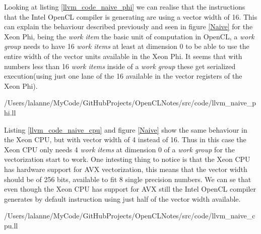 \par{Looking at listing \ref{llvm_code_naive_phi} we can realise that the 
    instructions that the Intel OpenCL compiler is generating are using a vector
    width of 16. This can explain the behaviour described previously and seen in
    figure \ref{Naive} for the Xeon Phi, being the \emph{work item} the basic 
    unit of computation in OpenCL, a \emph{work group} needs to have 16 \emph{
    work items} at least at dimension 0 to be able to use the entire width
    of the vector units available in the Xeon Phi. It seems that with numbers 
    less than 16 \emph{work items} inside of a \emph{work group} these 
    get serialized execution(using just one lane of the 16 available in the 
    vector registers of the Xeon Phi).}


    {/Users/lalanne/MyCode/GitHubProjects/OpenCLNotes/src/code/llvm_naive_phi.ll}

\par{Listing \ref{llvm_code_naive_cpu} and figure \ref{Naive} show the same 
    behaviour in the Xeon CPU, but with vector width of 4 instead of 16. Thus 
    in this case the Xeon CPU only needs 4 \emph{work items} at dimension 0
    of a \emph{work group} for the vectorization start to work. One intesting
    thing to notice is that the Xeon CPU has hardware support for AVX 
    vectorization, this means that the vector width should be of 256 bits, 
    available to fit 8 single precision numbers. We can se that even though 
    the Xeon CPU has support for AVX still the Intel OpenCL compiler generates
    by default instruction using just half of the vector width available.}


    {/Users/lalanne/MyCode/GitHubProjects/OpenCLNotes/src/code/llvm_naive_cpu.ll}

